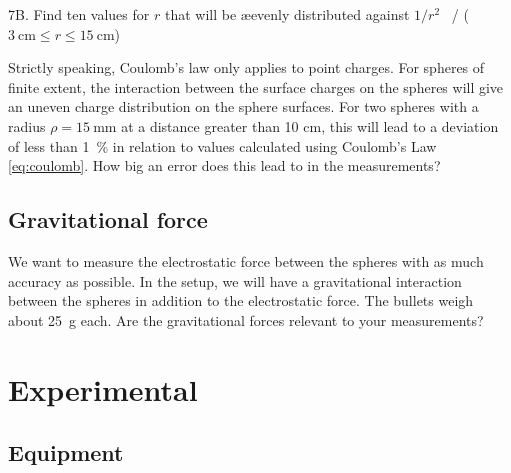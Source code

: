 \documentclass[../Elmag-labhefte-2022.tex]{subfiles}
\begin{document}
\begin{itemize}
{\itsf 7B. Find ten values   for $r$ that will be \ae evenly distributed against $1/r^2$ \ /} ($\SI{3}{\cm} \leq r \leq \SI{15}{\cm}$)


Strictly speaking, Coulomb's law only applies to point charges. For spheres of finite extent, the interaction between the surface charges on the spheres will give an uneven charge distribution on the sphere surfaces. For two spheres with a radius $\rho = \SI{15}{\milli\m}$ at a distance greater than 10 cm, this will lead to a deviation of less than \SI{1}{\percent} in relation to values   calculated using Coulomb's Law \eqref{eq:coulomb}. How big an error does this lead to in the measurements?


\subsection{Gravitational force}

We want to measure the electrostatic force between the spheres with as much accuracy as possible. In the setup, we will have a gravitational interaction between the spheres in addition to the electrostatic force. The bullets weigh about \SI{25}{\g} each. Are the gravitational forces relevant to your measurements?

 
\clearpage


\section{Experimental}

\subsection{Equipment}


\end{itemize}
\end{document}
